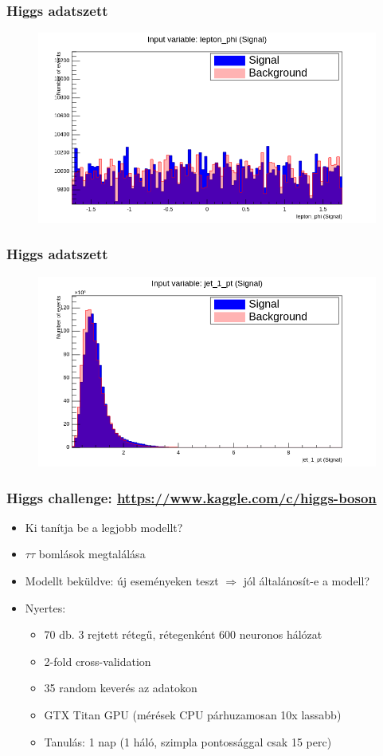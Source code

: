 \documentclass{beamer}
\begin{document}
\begin{frame}
\frametitle{Higgs adatszett}
\begin{figure}[H]
	\centering
    	\includegraphics[width=\textwidth]{pic/higgs/4}
\end{figure}
\end{frame}
\begin{frame}
\frametitle{Higgs adatszett}
\begin{figure}[H]
	\centering
    	\includegraphics[width=\textwidth]{pic/higgs/5}
\end{figure}
\end{frame}

\begin{frame}
\frametitle{Higgs challenge: \url{https://www.kaggle.com/c/higgs-boson}}
\begin{itemize}
  \setlength{\itemsep}{18pt}
   \item Ki tanítja be a legjobb modellt?
  \item $\tau\tau$ bomlások megtalálása
  \item Modellt beküldve: új eseményeken teszt $\Rightarrow$ jól általánosít-e a modell?
  \item Nyertes: 
  	\begin{itemize}
  	  \setlength{\itemsep}{6pt}
  		\item 70 db. 3 rejtett rétegű, rétegenként 600 neuronos hálózat
  		\item 2-fold cross-validation
  		\item 35 random keverés az adatokon
  		\item GTX Titan GPU (mérések CPU párhuzamosan 10x lassabb)
  		\item Tanulás: 1 nap (1 háló, szimpla pontossággal csak 15 perc)
  	\end{itemize}
\end{itemize}
\end{frame}
\end{document}
